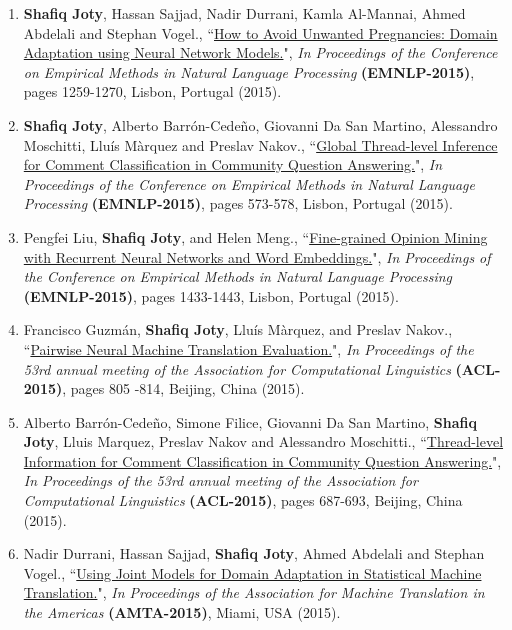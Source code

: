 \documentclass[paper=letter,fontsize=11pt]{scrartcl} %
\newcommand{\PaperEntry}[7]{
		\noindent #1, ``\href{#7}{#2}", \textit{#3} \textbf{#4}, #5 (#6).}
\begin{document}
\begin{enumerate}
\item \PaperEntry{\textbf{Shafiq Joty}, Hassan Sajjad, Nadir Durrani, Kamla Al-Mannai, Ahmed Abdelali and Stephan Vogel.}{How to Avoid Unwanted Pregnancies: Domain Adaptation using Neural Network Models.}{In Proceedings of the Conference on Empirical Methods in Natural Language Processing} {(EMNLP-2015)}{pages 1259-1270, Lisbon, Portugal}{2015}
{http://aclweb.org/anthology/D/D15/D15-1147.pdf}

\item \PaperEntry{\textbf{Shafiq Joty}, Alberto Barrón-Cedeño, Giovanni Da San Martino, Alessandro Moschitti, Lluís Màrquez and Preslav Nakov.}{Global Thread-level Inference for Comment Classification in Community Question Answering.}{In Proceedings of the Conference on Empirical Methods in Natural Language Processing} {(EMNLP-2015)}{pages 573-578, Lisbon, Portugal}{2015}
{http://aclweb.org/anthology/D/D15/D15-1068.pdf}

\item \PaperEntry{Pengfei Liu, \textbf{Shafiq Joty}, and Helen Meng.}{Fine-grained Opinion Mining with Recurrent Neural Networks and Word Embeddings.}{In Proceedings of the Conference on Empirical Methods in Natural Language Processing} {(EMNLP-2015)}{pages 1433-1443, Lisbon, Portugal}{2015}
{http://aclweb.org/anthology/D/D15/D15-1168.pdf}

\item \PaperEntry{Francisco Guzmán, \textbf{Shafiq Joty}, Lluís Màrquez, and Preslav Nakov.}{Pairwise Neural Machine Translation Evaluation.}{In Proceedings of the 53rd annual meeting of the Association for Computational Linguistics} {(ACL-2015)}{pages 805 -814, Beijing, China}{2015}
{https://aclweb.org/anthology/P/P15/P15-1078.pdf}

\item \PaperEntry{Alberto Barrón-Cedeño, Simone Filice, Giovanni Da San Martino, \textbf{Shafiq Joty}, Lluis Marquez, Preslav Nakov and Alessandro Moschitti.}{Thread-level Information for Comment Classification in Community Question Answering.}{In Proceedings of the 53rd annual meeting of the Association for Computational Linguistics} {(ACL-2015)}{pages 687-693, Beijing, China}{2015}
{http://www.aclweb.org/anthology/P15-2113}

\item \PaperEntry{Nadir Durrani, Hassan Sajjad, \textbf{Shafiq Joty}, Ahmed Abdelali and Stephan Vogel.}{Using Joint Models for Domain Adaptation in Statistical Machine Translation.}{In Proceedings of the Association for Machine Translation in the Americas} {(AMTA-2015)}{Miami, USA}{2015}
{http://www.researchgate.net/publication/281556042_Using_Joint_Models_for_Domain_Adaptation_in_Statistical_Machine_Translation}
\end{enumerate}
\end{document}
